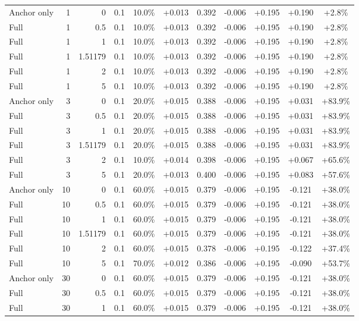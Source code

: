 \begin{table}[htbp]
\begin{tabular}{lrrrccccccc}
Anchor only & 1 & 0 & 0.1 & 10.0\% & +0.013 & 0.392 & -0.006 & +0.195 & +0.190 & +2.8\% \\
Full & 1 & 0.5 & 0.1 & 10.0\% & +0.013 & 0.392 & -0.006 & +0.195 & +0.190 & +2.8\% \\
Full & 1 & 1 & 0.1 & 10.0\% & +0.013 & 0.392 & -0.006 & +0.195 & +0.190 & +2.8\% \\
Full & 1 & 1.51179 & 0.1 & 10.0\% & +0.013 & 0.392 & -0.006 & +0.195 & +0.190 & +2.8\% \\
Full & 1 & 2 & 0.1 & 10.0\% & +0.013 & 0.392 & -0.006 & +0.195 & +0.190 & +2.8\% \\
Full & 1 & 5 & 0.1 & 10.0\% & +0.013 & 0.392 & -0.006 & +0.195 & +0.190 & +2.8\% \\
Anchor only & 3 & 0 & 0.1 & 20.0\% & +0.015 & 0.388 & -0.006 & +0.195 & +0.031 & +83.9\% \\
Full & 3 & 0.5 & 0.1 & 20.0\% & +0.015 & 0.388 & -0.006 & +0.195 & +0.031 & +83.9\% \\
Full & 3 & 1 & 0.1 & 20.0\% & +0.015 & 0.388 & -0.006 & +0.195 & +0.031 & +83.9\% \\
Full & 3 & 1.51179 & 0.1 & 20.0\% & +0.015 & 0.388 & -0.006 & +0.195 & +0.031 & +83.9\% \\
Full & 3 & 2 & 0.1 & 10.0\% & +0.014 & 0.398 & -0.006 & +0.195 & +0.067 & +65.6\% \\
Full & 3 & 5 & 0.1 & 20.0\% & +0.013 & 0.400 & -0.006 & +0.195 & +0.083 & +57.6\% \\
Anchor only & 10 & 0 & 0.1 & 60.0\% & +0.015 & 0.379 & -0.006 & +0.195 & -0.121 & +38.0\% \\
Full & 10 & 0.5 & 0.1 & 60.0\% & +0.015 & 0.379 & -0.006 & +0.195 & -0.121 & +38.0\% \\
Full & 10 & 1 & 0.1 & 60.0\% & +0.015 & 0.379 & -0.006 & +0.195 & -0.121 & +38.0\% \\
Full & 10 & 1.51179 & 0.1 & 60.0\% & +0.015 & 0.379 & -0.006 & +0.195 & -0.121 & +38.0\% \\
Full & 10 & 2 & 0.1 & 60.0\% & +0.015 & 0.378 & -0.006 & +0.195 & -0.122 & +37.4\% \\
Full & 10 & 5 & 0.1 & 70.0\% & +0.012 & 0.386 & -0.006 & +0.195 & -0.090 & +53.7\% \\
Anchor only & 30 & 0 & 0.1 & 60.0\% & +0.015 & 0.379 & -0.006 & +0.195 & -0.121 & +38.0\% \\
Full & 30 & 0.5 & 0.1 & 60.0\% & +0.015 & 0.379 & -0.006 & +0.195 & -0.121 & +38.0\% \\
Full & 30 & 1 & 0.1 & 60.0\% & +0.015 & 0.379 & -0.006 & +0.195 & -0.121 & +38.0\% \\

\end{tabular}
\end{table}
